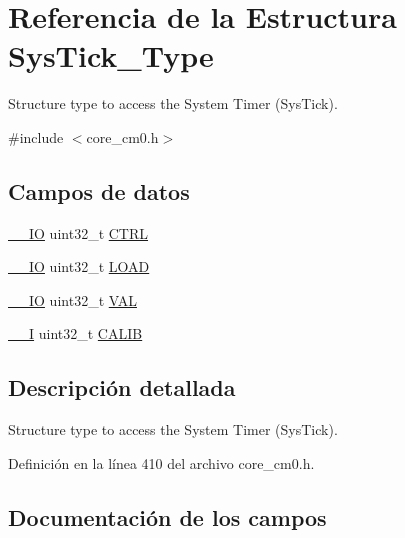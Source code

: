 \hypertarget{struct_sys_tick___type}{}\section{Referencia de la Estructura Sys\+Tick\+\_\+\+Type}
\label{struct_sys_tick___type}


Structure type to access the System Timer (Sys\+Tick).  




{\ttfamily \#include $<$core\+\_\+cm0.\+h$>$}

\subsection*{Campos de datos}
\begin{DoxyCompactItemize}
\item 
\hyperlink{core__sc300_8h_aec43007d9998a0a0e01faede4133d6be}{\+\_\+\+\_\+\+IO} uint32\+\_\+t \hyperlink{struct_sys_tick___type_a15fc8d35f045f329b80c544bef35ff64}{C\+T\+RL}
\item 
\hyperlink{core__sc300_8h_aec43007d9998a0a0e01faede4133d6be}{\+\_\+\+\_\+\+IO} uint32\+\_\+t \hyperlink{struct_sys_tick___type_aad9adf4efc940cddb8161b69cfbe19d3}{L\+O\+AD}
\item 
\hyperlink{core__sc300_8h_aec43007d9998a0a0e01faede4133d6be}{\+\_\+\+\_\+\+IO} uint32\+\_\+t \hyperlink{struct_sys_tick___type_a26fb318c3b0a0ec7f45daafd5f8799a3}{V\+AL}
\item 
\hyperlink{core__sc300_8h_af63697ed9952cc71e1225efe205f6cd3}{\+\_\+\+\_\+I} uint32\+\_\+t \hyperlink{struct_sys_tick___type_a40e07d0a4638a676780713b6ceeec4ef}{C\+A\+L\+IB}
\end{DoxyCompactItemize}


\subsection{Descripción detallada}
Structure type to access the System Timer (Sys\+Tick). 

Definición en la línea 410 del archivo core\+\_\+cm0.\+h.



\subsection{Documentación de los campos}
